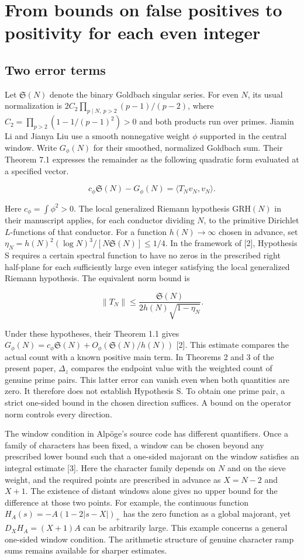 \documentclass[11pt,a4paper]{article}
\begin{document}
\section{From bounds on false positives to positivity for each even integer}

\subsection{Two error terms}

Let $\mathfrak S(N)$ denote the binary Goldbach singular series. For even $N$, its usual normalization is $2C_2\prod_{p\mid N,\ p>2}(p-1)/(p-2)$, where $C_2=\prod_{p>2}(1-1/(p-1)^2)>0$ and both products run over primes. Jiamin Li and Jianya Liu use a smooth nonnegative weight $\phi$ supported in the central window. Write $G_\phi(N)$ for their smoothed, normalized Goldbach sum. Their Theorem 7.1 expresses the remainder as the following quadratic form evaluated at a specified vector.

\[
c_\phi\mathfrak S(N)-G_\phi(N)=\langle T_Nv_N,v_N\rangle.
\]

Here $c_\phi=\int\phi^2>0$. The local generalized Riemann hypothesis $\mathrm{GRH}(N)$ in their manuscript applies, for each conductor dividing $N$, to the primitive Dirichlet $L$-functions of that conductor. For a function $h(N)\to\infty$ chosen in advance, set $\eta_N=h(N)^2(\log N)^3/[N\mathfrak S(N)]\le1/4$. In the framework of [2], Hypothesis S requires a certain spectral function to have no zeros in the prescribed right half-plane for each sufficiently large even integer satisfying the local generalized Riemann hypothesis. The equivalent norm bound is

\[
\|T_N\|\le\frac{\mathfrak S(N)}{2h(N)\sqrt{1-\eta_N}}.
\]

Under these hypotheses, their Theorem 1.1 gives $G_\phi(N)=c_\phi\mathfrak S(N)+O_\phi(\mathfrak S(N)/h(N))$ [2]. This estimate compares the actual count with a known positive main term. In Theorems 2 and 3 of the present paper, $\Delta_z$ compares the endpoint value with the weighted count of genuine prime pairs. This latter error can vanish even when both quantities are zero. It therefore does not establish Hypothesis S. To obtain one prime pair, a strict one-sided bound in the chosen direction suffices. A bound on the operator norm controls every direction.

The window condition in Alpöge's source code has different quantifiers. Once a family of characters has been fixed, a window can be chosen beyond any prescribed lower bound such that a one-sided majorant on the window satisfies an integral estimate [3]. Here the character family depends on $N$ and on the sieve weight, and the required points are prescribed in advance as $X=N-2$ and $X+1$. The existence of distant windows alone gives no upper bound for the difference at those two points. For example, the continuous function $H_A(s)=-A(1-2|s-X|)_+$ has the zero function as a global majorant, yet $D_XH_A=(X+1)A$ can be arbitrarily large. This example concerns a general one-sided window condition. The arithmetic structure of genuine character ramp sums remains available for sharper estimates.
\end{document}
